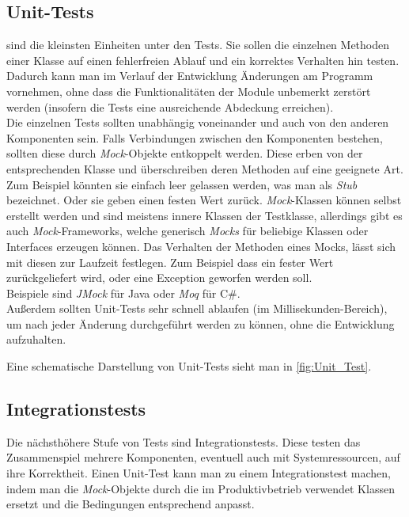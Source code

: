 \subsection{Unit-Tests} 

 sind die kleinsten Einheiten unter den Tests. Sie sollen die einzelnen Methoden einer Klasse auf einen fehlerfreien Ablauf und ein korrektes Verhalten hin testen. Dadurch kann man im Verlauf der Entwicklung Änderungen am Programm vornehmen, ohne dass die Funktionalitäten der Module unbemerkt zerstört werden (insofern die Tests eine ausreichende Abdeckung erreichen).\\
Die einzelnen Tests sollten unabhängig voneinander und auch von den anderen Komponenten sein. Falls Verbindungen zwischen den Komponenten bestehen, sollten diese durch \textit{Mock}-Objekte entkoppelt werden. Diese erben von der entsprechenden Klasse und überschreiben deren Methoden auf eine geeignete Art. Zum Beispiel könnten sie einfach leer gelassen werden, was man als \textit{Stub} bezeichnet. Oder sie geben einen festen Wert zurück. \textit{Mock}-Klassen können selbst erstellt werden und sind meistens innere Klassen der Testklasse, allerdings gibt es auch \textit{Mock}-Frameworks, welche generisch \textit{Mocks} für beliebige Klassen oder Interfaces erzeugen können. Das Verhalten der Methoden eines Mocks, lässt sich mit diesen zur Laufzeit festlegen. Zum Beispiel dass ein fester Wert zurückgeliefert wird, oder eine Exception geworfen werden soll.\\ Beispiele sind \textit{JMock} für Java oder \textit{Moq} für C\#.\\
Außerdem sollten Unit-Tests sehr schnell ablaufen (im Millisekunden-Bereich), um nach jeder Änderung durchgeführt werden zu können, ohne die Entwicklung aufzuhalten.

Eine schematische Darstellung von Unit-Tests sieht man in \autoref{fig:Unit_Test}.

\subsection{Integrationstests}

Die nächsthöhere Stufe von Tests sind Integrationstests. Diese testen das Zusammenspiel mehrere Komponenten, eventuell auch mit Systemressourcen, auf ihre Korrektheit. Einen Unit-Test kann man zu einem Integrationstest machen, indem man die \textit{Mock}-Objekte durch die im Produktivbetrieb verwendet Klassen ersetzt und die Bedingungen entsprechend anpasst.

